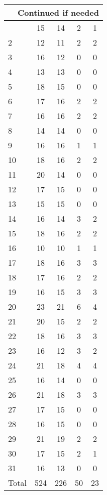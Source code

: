 \begin{center}
\begin{longtable}{l|c|c|c|c}
\hline \multicolumn{5}{|r|}{{Continued if needed}} \\ \hline
\endfoot 
1 & 15 & 14 & 2 & 1\\ \hline
2 & 12 & 11 & 2 & 2\\ \hline
3 & 16 & 12 & 0 & 0\\ \hline
4 & 13 & 13 & 0 & 0\\ \hline
5 & 18 & 15 & 0 & 0\\ \hline
6 & 17 & 16 & 2 & 2\\ \hline
7 & 16 & 16 & 2 & 2\\ \hline
8 & 14 & 14 & 0 & 0\\ \hline
9 & 16 & 16 & 1 & 1\\ \hline
10 & 18 & 16 & 2 & 2\\ \hline
11 & 20 & 14 & 0 & 0\\ \hline
12 & 17 & 15 & 0 & 0\\ \hline
13 & 15 & 15 & 0 & 0\\ \hline
14 & 16 & 14 & 3 & 2\\ \hline
15 & 18 & 16 & 2 & 2\\ \hline
16 & 10 & 10 & 1 & 1\\ \hline
17 & 18 & 16 & 3 & 3\\ \hline
18 & 17 & 16 & 2 & 2\\ \hline
19 & 16 & 15 & 3 & 3\\ \hline
20 & 23 & 21 & 6 & 4\\ \hline
21 & 20 & 15 & 2 & 2\\ \hline
22 & 18 & 16 & 3 & 3\\ \hline
23 & 16 & 12 & 3 & 2\\ \hline
24 & 21 & 18 & 4 & 4\\ \hline
25 & 16 & 14 & 0 & 0\\ \hline
26 & 21 & 18 & 3 & 3\\ \hline
27 & 17 & 15 & 0 & 0\\ \hline
28 & 16 & 15 & 0 & 0\\ \hline
29 & 21 & 19 & 2 & 2\\ \hline
30 & 17 & 15 & 2 & 1\\ \hline
31 & 16 & 13 & 0 & 0\\ \hline
\hline \hline
Total & 524 & 226 & 50 & 23




\end{longtable}
\end{center}



